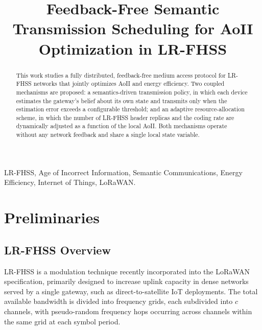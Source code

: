 \documentclass[lettersize,journal]{IEEEtran}
\begin{document}

\title{Feedback-Free Semantic Transmission Scheduling for AoII Optimization in LR-FHSS}


\maketitle

\begin{abstract}
This work studies a fully distributed, feedback-free medium access protocol for \ac{LR-FHSS} networks that jointly optimizes \ac{AoII} and energy efficiency. Two coupled mechanisms are proposed: a semantics-driven transmission policy, in which each device estimates the gateway's belief about its own state and transmits only when the estimation error exceeds a configurable threshold; and an adaptive resource-allocation scheme, in which the number of \ac{LR-FHSS} header replicas and the coding rate are dynamically adjusted as a function of the local \ac{AoII}. Both mechanisms operate without any network feedback and share a single local state variable.
\end{abstract}

\begin{IEEEkeywords}
LR-FHSS, Age of Incorrect Information, Semantic Communications, Energy Efficiency, Internet of Things, LoRaWAN.
\end{IEEEkeywords}

\section{Preliminaries}
\label{sec:preliminaries}

\subsection{LR-FHSS Overview}
\label{subsec:lrfhss}

\ac{LR-FHSS} is a modulation technique recently incorporated into the LoRaWAN specification, primarily designed to increase uplink capacity in dense networks served by a single gateway, such as direct-to-satellite \ac{IoT} deployments. The total available bandwidth is divided into frequency grids, each subdivided into $c$ channels, with pseudo-random frequency hops occurring across channels within the same grid at each symbol period.
\end{document}
